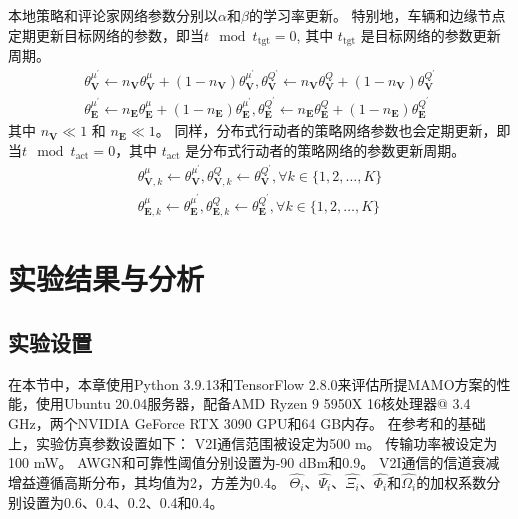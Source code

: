 本地策略和评论家网络参数分别以$\alpha$和$\beta$的学习率更新。
特别地，车辆和边缘节点定期更新目标网络的参数，即当$t \mod t_{\operatorname{tgt}} = 0$, 其中 $t_{\operatorname{tgt}}$ 是目标网络的参数更新周期。
\begin{align}
	\theta_{\mathbf{V}}^{\mu^{\prime}} \leftarrow n_{\mathbf{V}} \theta_{\mathbf{V}}^{\mu}+(1-n_{\mathbf{V}}) \theta_{\mathbf{V}}^{\mu^{\prime}}, \theta_{\mathbf{V}}^{Q^{\prime}} \leftarrow n_{\mathbf{V}} \theta_{\mathbf{V}}^{Q}+(1-n_{\mathbf{V}}) \theta_{\mathbf{V}}^{Q^{\prime}}\\
	\theta_{\mathbf{E}}^{\mu^{\prime}} \leftarrow n_{\mathbf{E}} \theta_{\mathbf{E}}^{\mu}+(1-n_{\mathbf{E}}) \theta_{\mathbf{E}}^{\mu^{\prime}}, \theta_{\mathbf{E}}^{Q^{\prime}} \leftarrow n_{\mathbf{E}} \theta_{\mathbf{E}}^{Q}+(1-n_{\mathbf{E}})  \theta_{\mathbf{E}}^{Q^{\prime}}
\end{align}
\noindent 其中 $n_{\mathbf{V}} \ll 1$ 和 $n_{\mathbf{E}} \ll 1$。
同样，分布式行动者的策略网络参数也会定期更新，即当$t \mod t_{\operatorname{act}} = 0$，其中 $t_{\operatorname{act}}$ 是分布式行动者的策略网络的参数更新周期。
\begin{align}
	\theta_{\mathbf{V}, k}^{\mu} \leftarrow \theta^{{\mu}^{\prime}}_{\mathbf{V}}, \theta_{\mathbf{V}, k}^{Q} \leftarrow \theta_{\mathbf{V}}^{Q^{\prime}}, \forall k \in \{1, 2, \ldots, K\}\\
	\theta_{\mathbf{E}, k}^{\mu} \leftarrow \theta_{\mathbf{E}}^{\mu^{\prime}}, \theta_{\mathbf{E}, k}^{Q} \leftarrow \theta_{\mathbf{E}}^{Q^{\prime}}, \forall k \in \{1, 2, \ldots, K\}
\end{align}

\section{实验结果与分析}\label{section 4-6}

\subsection{实验设置}

在本节中，本章使用Python 3.9.13和TensorFlow 2.8.0来评估所提MAMO方案的性能，使用Ubuntu 20.04服务器，配备AMD Ryzen 9 5950X 16核处理器@ 3.4 GHz，两个NVIDIA GeForce RTX 3090 GPU和64 GB内存。
在参考和的基础上，实验仿真参数设置如下：
V2I通信范围被设定为500 m。
传输功率被设定为100 mW。
AWGN和可靠性阈值分别设置为-90 dBm和0.9。
V2I通信的信道衰减增益遵循高斯分布，其均值为2，方差为0.4。
$\hat{\Theta_{i}}$、$\hat{\Psi_{i}}$、$\hat{\Xi_{i}}$、$\hat{\Phi_{i}}$和$\hat{\Omega_{i}}$的加权系数分别设置为0.6、0.4、0.2、0.4和0.4。

